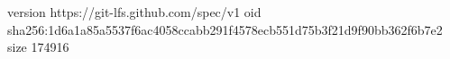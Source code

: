version https://git-lfs.github.com/spec/v1
oid sha256:1d6a1a85a5537f6ac4058ccabb291f4578ecb551d75b3f21d9f90bb362f6b7e2
size 174916
